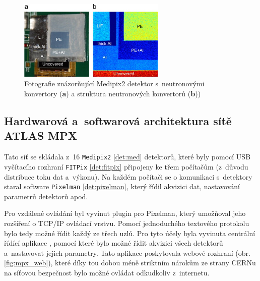 \begin{figure}[ht]
	\begin{center}
		\includegraphics[width=7cm]{figures/mpx-layers.jpg}
		\caption{Fotografie znázorňující Medipix2 detektor s~neutronovými konvertory (\textbf{a}) a struktura neutronových konvertorů (\textbf{b})) \cite{Vykydal200935}}
		\label{fig:mpx_lay}
	\end{center}
\end{figure}

\subsection{Hardwarová a~softwarová architektura sítě ATLAS MPX}
Tato síť se skládala z~16 \texttt{Medipix2} \ref{det:med} detektorů, které byly pomocí USB vyčítacího rozhraní \texttt{FITPix} \ref{det:fitpix} připojeny ke třem počítačům (z~důvodu distribuce toku dat a~výkonu). Na každém počítači se o komunikaci s~detektory staral software \texttt{Pixelman} \ref{det:pixelman}, který řídil akvizici dat, nastavování parametrů detektorů apod. 

Pro vzdálené ovládání byl vyvinut plugin pro Pixelman, který umožňoval jeho rozšíření o TCP/IP ovládací vrstvu. Pomocí jednoduchého textového protokolu bylo tedy možné řídit každý ze třech uzlů. Pro tyto účely byla vyvinuta centrální řídící aplikace \cite{Turecek2011S45}, pomocí které bylo možné řídit akvizici všech detektorů a~nastavovat jejich parametry. Tato aplikace poskytovala webové rozhraní (obr. \ref{fig:mpx_web}), které díky tou dobou méně 
striktním nárokům ze strany CERNu na síťovou bezpečnost bylo možné ovládat odkudkoliv z~internetu.

